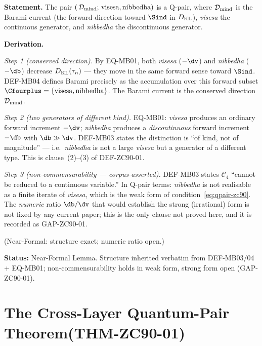 \documentclass[12pt, a4paper]{article}
\begin{document}
\begin{formalbox}[title={LEM-ZC90-02: The Mind-Layer Pair Is a Q-Pair
  ($R_0$, Near-Formal)}]

\textbf{Statement.} The pair
$(\,\mathcal{D}_{\rm mind};\,\text{visesa},\text{nibbedha})$ is a Q-pair,
where $\mathcal{D}_{\rm mind}$ is the Barami current (the forward
direction toward $\Sind$ in $D_{\rm KL}$), \emph{visesa} the continuous
generator, and \emph{nibbedha} the discontinuous generator.

\textbf{Derivation.}

\textit{Step 1 (conserved direction).}
By EQ-MB01, both \emph{visesa} ($-\dv$) and \emph{nibbedha} ($-\db$)
decrease $D_{\rm KL}(\tau_n)$ --- they move in the same forward sense
toward $\Sind$. DEF-MB04 defines Barami precisely as the accumulation
over this forward subset $\Cfourplus=\{\text{visesa},\text{nibbedha}\}$.
The Barami current is the conserved direction $\mathcal{D}_{\rm mind}$.

\textit{Step 2 (two generators of different kind).}
EQ-MB01: \emph{visesa} produces an ordinary forward increment $-\dv$;
\emph{nibbedha} produces a \emph{discontinuous} forward increment $-\db$
with $\db\gg\dv$. DEF-MB03 states the distinction is ``of kind, not of
magnitude'' --- i.e.\ \emph{nibbedha} is not a large \emph{visesa} but a
generator of a different type. This is clause~(2)--(3) of DEF-ZC90-01.

\textit{Step 3 (non-commensurability --- corpus-asserted).}
DEF-MB03 states $\mathcal{C}_4$ ``cannot be reduced to a continuous
variable.'' In Q-pair terms: \emph{nibbedha} is not realisable as a
finite iterate of \emph{visesa}, which is the weak form of
condition~\eqref{eq:qpair-zc90}. The \emph{numeric} ratio $\db/\dv$ that would
establish the strong (irrational) form is not fixed by any current paper;
this is the only clause not proved here, and it is recorded as
GAP-ZC90-01.

\hfill (Near-Formal: structure exact; numeric ratio open.)

\textbf{Status:} Near-Formal Lemma. Structure inherited verbatim from
DEF-MB03/04 + EQ-MB01; non-commensurability holds in weak form, strong
form open (GAP-ZC90-01).
\end{formalbox}

\section{The Cross-Layer Quantum-Pair Theorem\quad(THM-ZC90-01)}
\label{sec:thm-zc90}
\end{document}
